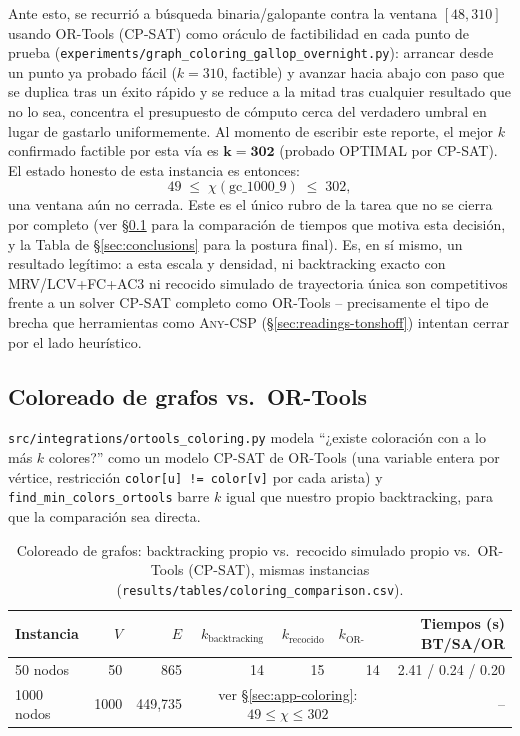 \documentclass[11pt,onecolumn,letterpaper]{article}
\newcommand{\code}[1]{\texttt{#1}}
\begin{document}
Ante esto, se recurri\'o a b\'usqueda binaria/galopante contra la ventana
$[48,310]$ usando OR-Tools (CP-SAT) como or\'aculo de factibilidad en cada punto de
prueba (\code{experiments/graph\_coloring\_gallop\_overnight.py}): arrancar desde un punto
ya probado f\'acil ($k=310$, factible) y avanzar hacia abajo con paso que se duplica tras un
\'exito r\'apido y se reduce a la mitad tras cualquier resultado que no lo sea, concentra el
presupuesto de c\'omputo cerca del verdadero umbral en lugar de gastarlo uniformemente. Al
momento de escribir este reporte, el mejor $k$ confirmado factible por esta v\'ia es
$\mathbf{k=302}$ (probado \textsc{OPTIMAL} por CP-SAT). El estado honesto de esta instancia
es entonces:
\begin{equation}
49 \;\le\; \chi(\text{gc\_1000\_9}) \;\le\; 302,
\end{equation}
una ventana a\'un no cerrada. Este es el \'unico rubro de la tarea que no se cierra por
completo (ver \S\ref{sec:app-ortools} para la comparaci\'on de tiempos que motiva esta
decisi\'on, y la Tabla de \S\ref{sec:conclusions} para la postura final). Es, en s\'i mismo,
un resultado leg\'itimo: a esta escala y densidad, ni backtracking exacto con MRV/LCV+FC+AC3
ni recocido simulado de trayectoria \'unica son competitivos frente a un solver CP-SAT
completo como OR-Tools -- precisamente el tipo de brecha que herramientas como
\textsc{Any-CSP} (\S\ref{sec:readings-tonshoff}) intentan cerrar por el lado heur\'istico.

\subsection{Coloreado de grafos vs.\ OR-Tools}
\label{sec:app-ortools}

\code{src/integrations/ortools\_coloring.py} modela ``¿existe coloraci\'on con a lo m\'as $k$ colores?'' como un modelo CP-SAT de OR-Tools (una variable
entera por v\'ertice, restricci\'on \code{color[u] != color[v]} por cada arista) y
\code{find\_min\_colors\_ortools} barre $k$ igual que nuestro propio backtracking, para que
la comparaci\'on sea directa.

\begin{table}[H]
\centering
\small
\caption{Coloreado de grafos: backtracking propio vs.\ recocido simulado propio vs.\
OR-Tools (CP-SAT), mismas instancias (\code{results/tables/coloring\_comparison.csv}).}
\label{tab:coloring-small}
\begin{tabular}{@{}lrrrrrr@{}}
\toprule
Instancia & $V$ & $E$ & $k_{\text{backtracking}}$ & $k_{\text{recocido}}$ & $k_{\text{OR-Tools}}$ & Tiempos (s) BT/SA/OR \\
\midrule
50 nodos   & 50   & 865     & 14 & 15 & 14 & 2.41 / 0.24 / 0.20 \\
1000 nodos & 1000 & 449{,}735 & \multicolumn{3}{c}{ver \S\ref{sec:app-coloring}: $49\le\chi\le302$} & -- \\
\bottomrule
\end{tabular}
\end{table}
\end{document}

